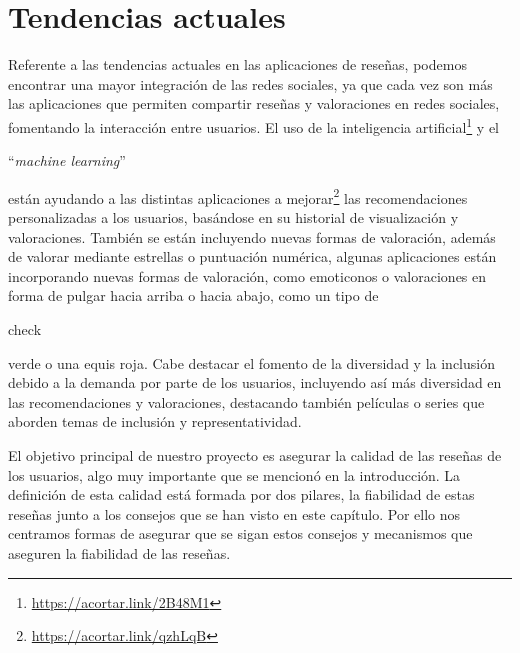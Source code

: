 \section{Tendencias actuales}

Referente a las tendencias actuales en las aplicaciones de reseñas, podemos encontrar una mayor integración de las redes sociales, ya que cada vez son más las aplicaciones que permiten compartir reseñas y valoraciones en redes sociales, fomentando la interacción entre usuarios. El uso de la inteligencia artificial\footnote{\url{https://acortar.link/2B48M1}} y el \begin{otherlanguage}{english}``\textit{machine learning}''\end{otherlanguage} \cite{MachLear} están ayudando a las distintas aplicaciones a mejorar\footnote{\url{https://acortar.link/qzhLqB}} las recomendaciones personalizadas a los usuarios, basándose en su historial de visualización y valoraciones. También se están incluyendo nuevas formas de valoración, además de valorar mediante estrellas o puntuación numérica, algunas aplicaciones están incorporando nuevas formas de valoración, como emoticonos o valoraciones en forma de pulgar hacia arriba o hacia abajo, como un tipo de \begin{otherlanguage}{english}check \end{otherlanguage} verde o una equis roja. Cabe destacar el fomento de la diversidad y la inclusión debido a la demanda por parte de los usuarios, incluyendo así más diversidad en las recomendaciones y valoraciones, destacando también películas o series que aborden temas de inclusión y representatividad.

El objetivo principal de nuestro proyecto es asegurar la calidad de las reseñas de los usuarios, algo muy importante que se mencionó en la introducción. La definición de esta calidad está formada por dos pilares, la fiabilidad de estas reseñas junto a los consejos que se han visto en este capítulo. Por ello nos centramos formas de asegurar que se sigan estos consejos y mecanismos que aseguren la fiabilidad de las reseñas.  



